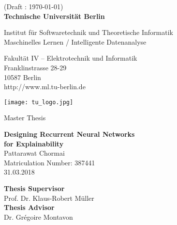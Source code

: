 \thispagestyle{empty}
\begin{center}
(Draft : \today) \\ 
\vspace*{1.4cm}
{\LARGE \textbf{Technische Universit\"at Berlin}}

\vspace{0.5cm}

{\large Institut f\"{u}r Softwaretechnik und Theoretische Informatik
\\[1mm]}
{\large Maschinelles Lernen / Intelligente Datenanalyse\\[5mm]}

Fakult\"{a}t IV -- Elektrotechnik und Informatik\\
Franklinstrasse 28-29\\
10587 Berlin\\
http://www.ml.tu-berlin.de\\

\vspace*{1cm}

\texttt{[image: tu\_logo.jpg]}

\vspace*{1.0cm}

{\LARGE{Master Thesis} }

\vspace{1.0cm}
{\LARGE \textbf{Designing Recurrent Neural Networks}}\\
\vspace*{0.3cm}
{\LARGE \textbf{ for Explainability}}\\
\vspace*{1.0cm}
{\LARGE Pattarawat Chormai}
\\
\vspace*{0.5cm}
Matriculation Number: 387441\\
31.03.2018\\ %
\vspace*{1.0cm}

\textbf{Thesis Supervisor}\\
Prof. Dr. Klaus-Robert M\"{u}ller\\
\vspace*{0.5cm}
\textbf{Thesis Advisor}\\
Dr. Gr\'{e}goire Montavon

\vspace{3cm}


\end{center}


